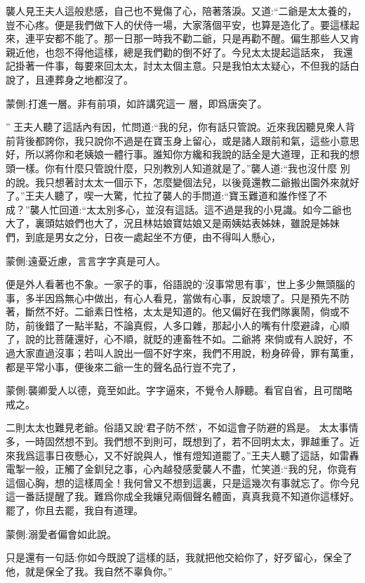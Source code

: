 \begin{parag}
    襲人見王夫人這般悲感，自己也不覺傷了心，陪著落淚。又道:“二爺是太太養的，豈不心疼。便是我們做下人的伏侍一場，大家落個平安，也算是造化了。要這樣起來，連平安都不能了。那一日那一時我不勸二爺，只是再勸不醒。偏生那些人又肯親近他，也怨不得他這樣，總是我們勸的倒不好了。今兒太太提起這話來， 我還記掛著一件事，每要來回太太，討太太個主意。只是我怕太太疑心，不但我的話白說了，且連葬身之地都沒了。\begin{note}蒙側:打進一層。非有前項，如許講究這一 層，即爲唐突了。\end{note}” 王夫人聽了這話內有因，忙問道:“我的兒，你有話只管說。近來我因聽見衆人背前背後都誇你，我只說你不過是在寶玉身上留心，或是諸人跟前和氣，這些小意思好，所以將你和老姨娘一體行事。誰知你方纔和我說的話全是大道理，正和我的想頭一樣。你有什麼只管說什麼，只別教別人知道就是了。”襲人道:“我也沒什麼 別的說。我只想著討太太一個示下，怎麼變個法兒，以後竟還教二爺搬出園外來就好了。”王夫人聽了，喫一大驚，忙拉了襲人的手問道:“寶玉難道和誰作怪了不成？”襲人忙回道:“太太別多心，並沒有這話。這不過是我的小見識。如今二爺也大了，裏頭姑娘們也大了，況且林姑娘寶姑娘又是兩姨姑表姊妹，雖說是姊妹 們，到底是男女之分，日夜一處起坐不方便，由不得叫人懸心，\begin{note}蒙側:遠憂近慮，言言字字真是可人。\end{note}便是外人看著也不象。一家子的事，俗語說的‘沒事常思有事’，世上多少無頭腦的事，多半因爲無心中做出，有心人看見，當做有心事，反說壞了。只是預先不防著，斷然不好。二爺素日性格，太太是知道的。他又偏好在我們隊裏鬧，倘或不防，前後錯了一點半點，不論真假，人多口雜，那起小人的嘴有什麼避諱，心順了，說的比菩薩還好，心不順，就貶的連畜牲不如。二爺將 來倘或有人說好，不過大家直過沒事；若叫人說出一個不好字來，我們不用說，粉身碎骨，罪有萬重，都是平常小事，便後來二爺一生的聲名品行豈不完了，\begin{note}蒙側:襲卿愛人以德，竟至如此。字字逼來，不覺令人靜聽。看官自省，且可闊略戒之。\end{note}二則太太也難見老爺。俗語又說‘君子防不然’，不如這會子防避的爲是。 太太事情多，一時固然想不到。我們想不到則可，既想到了，若不回明太太，罪越重了。近來我爲這事日夜懸心，又不好說與人，惟有燈知道罷了。”王夫人聽了這話，如雷轟電掣一般，正觸了金釧兒之事，心內越發感愛襲人不盡，忙笑道:“我的兒，你竟有這個心胸，想的這樣周全！我何曾又不想到這裏，只是這幾次有事就忘了。你今兒這一番話提醒了我。難爲你成全我孃兒兩個聲名體面，真真我竟不知道你這樣好。罷了，你且去罷，我自有道理。\begin{note}蒙側:溺愛者偏會如此說。\end{note}只是還有一句話:你如今既說了這樣的話，我就把他交給你了，好歹留心，保全了他，就是保全了我。我自然不辜負你。”
\end{parag}


